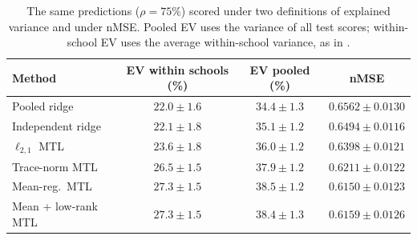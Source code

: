 \begin{table}[h]
\centering
\caption{The same predictions ($\rho = 75\%$) scored under two definitions of explained variance and under nMSE. Pooled EV uses the variance of all test scores; within-school EV uses the average within-school variance, as in \citet{argyriou2008convex}.}
\label{tab:metrics}
\small
\begin{tabular}{@{}lccc@{}}
\toprule
Method & EV within schools (\%) & EV pooled (\%) & nMSE \\
\midrule
Pooled ridge & $22.0 \pm 1.6$ & $34.4 \pm 1.3$ & $0.6562 \pm 0.0130$ \\
Independent ridge & $22.1 \pm 1.8$ & $35.1 \pm 1.2$ & $0.6494 \pm 0.0116$ \\
$\ell_{2,1}$ MTL & $23.6 \pm 1.8$ & $36.0 \pm 1.2$ & $0.6398 \pm 0.0121$ \\
Trace-norm MTL & $26.5 \pm 1.5$ & $37.9 \pm 1.2$ & $0.6211 \pm 0.0122$ \\
Mean-reg.\ MTL & $27.3 \pm 1.5$ & $38.5 \pm 1.2$ & $0.6150 \pm 0.0123$ \\
Mean + low-rank MTL & $27.3 \pm 1.5$ & $38.4 \pm 1.3$ & $0.6159 \pm 0.0126$ \\
\bottomrule
\end{tabular}
\end{table}
